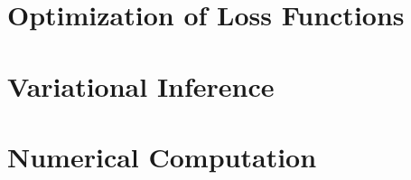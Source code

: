 \section{Optimization of Loss Functions}


\section{Variational Inference}


\section{Numerical Computation}

